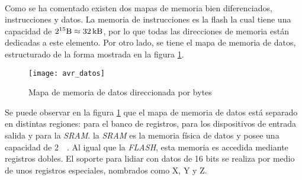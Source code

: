 \paragraph{}
Como se ha comentado existen dos mapas de memoria bien diferenciados, instrucciones y datos. La memoria de instrucciones es la flash la cual tiene una capacidad de $2^{15} \unit{\byte} \approx \SI{32}{\kilo\byte}$, por lo que todas las direcciones de memoria est\'an dedicadas a este elemento.
Por otro lado, se tiene el mapa de memoria de datos, estructurado de la forma mostrada en la figura \ref{fig:mem_datos}.
\begin{figure}[h]
    \centering
    \texttt{[image: avr\_datos]}
    \caption{Mapa de memoria de datos direccionada por bytes}
    \label{fig:mem_datos}
\end{figure}
Se puede observar en la figura \ref{fig:mem_datos} que el mapa de memoria de datos est\'a separado en distintas regiones: para el banco de registros, para los dispositivos de entrada salida y para la \textit{SRAM}. la \textit{SRAM} es la memoria f\'isica de datos y posee una capacidad de \SI{2}{\kilo\byte}. Al igual que la \textit{FLASH}, esta memoria es accedida mediante registros dobles. El soporte para lidiar con datos de 16 bits se realiza por medio de unos registros especiales, nombrados como X, Y y Z.
